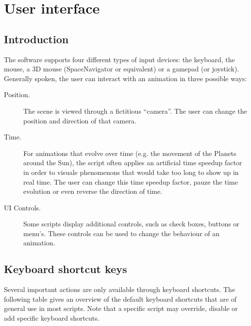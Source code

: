 \chapter{User interface}

\section{Introduction}


The software supports four different types of input devices: the keyboard, the mouse, a 3D mouse (SpaceNavigator or equivalent) or a gamepad (or joystick). Generally spoken, the user can interact with an animation in three possible ways:
\begin{description}
\item[Position.] The scene is viewed through a fictitious ``camera''. The user can change the position and direction of that camera.
\item[Time.] For animations that evolve over time (e.g. the movement of the Planets around the Sun), the script often applies an artificial time speedup factor in order to visuale phenomenons that would take too long to show up in real time. The user can change this time speedup factor, pauze the time evolution or even reverse the direction of time.
\item[UI Controls.] Some scripts display additional controls, such as check boxes, buttons or menu's. These controls can be used to change the behaviour of an animation.
\end{description}

\section{Keyboard shortcut keys}
Several important actions are only available through keyboard shortcuts. The following table gives an overview of the default keyboard shortcuts that are of general use in most scripts. Note that a specific script may override, disable or add specific keyboard shortcuts.

